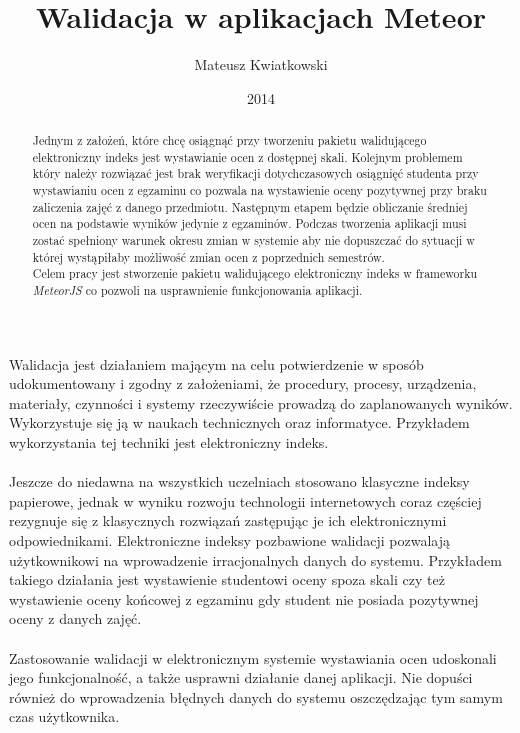 \documentclass[brudnopis]{xmgr}
\author   {Mateusz Kwiatkowski}
\title    {Walidacja w aplikacjach Meteor}
\date     {2014}
\begin{document}
\begin{abstract}
Jednym z założeń, które chcę osiągnąć  przy tworzeniu pakietu walidującego elektroniczny indeks jest
wystawianie ocen z dostępnej skali.  Kolejnym problemem który należy rozwiązać jest brak weryfikacji
dotychczasowych osiągnięć studenta przy wystawianiu ocen z egzaminu co pozwala na wystawienie oceny
pozytywnej przy braku zaliczenia zajęć z danego przedmiotu. Następnym etapem będzie obliczanie średniej
ocen na podstawie wyników jedynie z egzaminów. Podczas tworzenia aplikacji musi zostać spełniony
warunek okresu zmian w systemie aby nie dopuszczać do sytuacji w której wystąpiłaby możliwość zmian
ocen z poprzednich semestrów.
\\
Celem pracy jest stworzenie pakietu walidującego elektroniczny indeks w frameworku \textit{MeteorJS} co pozwoli
na usprawnienie funkcjonowania aplikacji.
 
\end{abstract}

\maketitle
%
\introduction

Walidacja jest działaniem mającym na celu potwierdzenie w sposób udokumentowany i zgodny
z założeniami, że procedury, procesy, urządzenia, materiały, czynności i systemy rzeczywiście
prowadzą do zaplanowanych wyników. Wykorzystuje się ją w naukach technicznych oraz informatyce.
Przykładem wykorzystania tej techniki jest elektroniczny indeks.
\\
\\
Jeszcze do niedawna na wszystkich uczelniach stosowano klasyczne indeksy papierowe,
jednak w wyniku rozwoju technologii internetowych coraz częściej rezygnuje się z klasycznych
rozwiązań zastępując je ich elektronicznymi odpowiednikami. Elektroniczne indeksy pozbawione
walidacji pozwalają użytkownikowi na wprowadzenie irracjonalnych danych do systemu.
Przykładem takiego działania jest wystawienie studentowi oceny spoza skali czy też wystawienie
oceny końcowej z egzaminu gdy student nie posiada pozytywnej oceny z danych zajęć.
\\
\\
Zastosowanie walidacji w elektronicznym systemie wystawiania ocen udoskonali jego funkcjonalność,
a także usprawni działanie danej aplikacji. Nie dopuści również do wprowadzenia błędnych danych do systemu
oszczędzając tym samym czas użytkownika.
\end{document}
